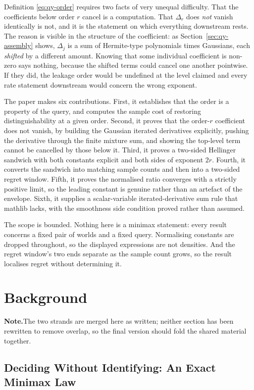 \documentclass[conference]{IEEEtran}
\theoremstyle{definition}
\newif\ifshownotes\shownotestrue
\newcommand{\NOTEPAR}[1]{\ifshownotes\par\vspace{2pt}\noindent%
  {\color{notecol}\textsf{\footnotesize\textbf{Note.}\;#1}}\par\vspace{2pt}\fi}
\begin{document}
Definition \eqref{eq:qy-order} requires two facts of very unequal difficulty. That the
coefficients below order $r$ cancel is a computation. That $\Delta_{r}$ does \emph{not}
vanish identically is not, and it is the statement on which everything downstream rests. The
reason is visible in the structure of the coefficient: as
Section~\ref{sec:qy-assembly} shows, $\Delta_{j}$ is a sum of Hermite-type polynomials times
Gaussians, each \emph{shifted} by a different amount. Knowing that some individual
coefficient is non-zero says nothing, because the shifted terms could cancel one another
pointwise. If they did, the leakage order would be undefined at the level claimed and every
rate statement downstream would concern the wrong exponent.

The paper makes six contributions. First, it establishes that the order is a property of the
query, and computes the sample cost of restoring distinguishability at a given order. Second,
it proves that the order-$r$ coefficient does not vanish, by building the Gaussian iterated
derivatives explicitly, pushing the derivative through the finite mixture sum, and showing
the top-level term cannot be cancelled by those below it. Third, it proves a two-sided
Hellinger sandwich with both constants explicit and both sides of exponent $2r$. Fourth, it
converts the sandwich into matching sample counts and then into a two-sided regret window.
Fifth, it proves the normalised ratio converges with a strictly positive limit, so the
leading constant is genuine rather than an artefact of the envelope. Sixth, it supplies a
scalar-variable iterated-derivative sum rule that mathlib lacks, with the smoothness side
condition proved rather than assumed.

The scope is bounded. Nothing here is a minimax statement: every result concerns a fixed
pair of worlds and a fixed query. Normalising constants are dropped throughout, so the
displayed expressions are not densities. And the regret window's two ends separate as the
sample count grows, so the result localises regret without determining it.


\section{Background}
\NOTEPAR{The two strands are merged here as written; neither section has been rewritten to remove overlap, so the final version should fold the shared material together.}

\subsection{Deciding Without Identifying: An Exact Minimax Law}
\end{document}
